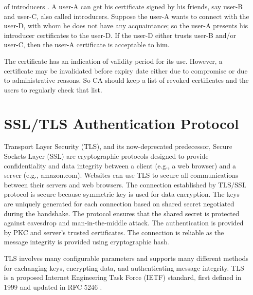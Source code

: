 \begin{multicols}{2}
\noindent
of introducers \cite{chap2-key1}. A user-A can get his certificate signed by his friends, say user-B and user-C, also called introducers. Suppose the user-A wants to connect with the user-D, with whom he does not have any acquaintance; so the user-A presents his introducer certificates to the user-D. If the user-D either trusts user-B and/or user-C, then the user-A certificate is acceptable to him.

The certificate has an indication of validity period for its use. However, a certificate may be invalidated before expiry date either due to compromise or due to administrative reasons. So CA should keep a list of revoked certificates and the users to regularly check that list.

\section*{SSL/TLS Authentication Protocol}

Transport Layer Security (TLS), and its now-deprecated predecessor, Secure Sockets Layer (SSL) are cryptographic protocols designed to provide confidentiality and data integrity between a client (e.g., a web browser) and a server (e.g., amazon.com). Websites can use TLS to secure all communications between their servers and web browsers. The connection established by TLS/SSL protocol is secure because symmetric key is used for data encryption. The keys are uniquely generated for each connection based on shared secret negotiated during the handshake. The protocol ensures that the shared secret is protected against eavesdrop and man-in-the-middle attack. The authentication is provided by PKC and server's trusted certificates. The connection is reliable as the message integrity is provided using cryptographic hash.

TLS involves many configurable parameters and supports many different methods for exchanging keys, encrypting data, and authenticating message integrity. TLS is a proposed Internet Engineering Task Force (IETF) standard, first defined in 1999 and updated in RFC 5246 \cite{chap2-key16}.


\end{multicols}
